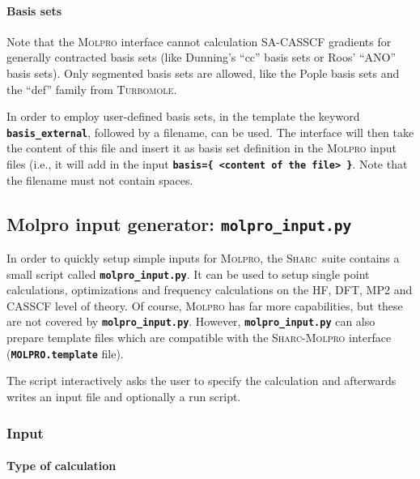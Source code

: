 \documentclass[a4paper,10pt,DIV=15,openany]{scrbook}
\newcommand{\sharc}{\textsc{Sharc}}
\newcommand{\ttt}[1]{\textbf{\texttt{#1}}}
\begin{document}
\paragraph{Basis sets}

Note that the \textsc{Molpro} interface cannot calculation SA-CASSCF gradients for generally contracted basis sets (like Dunning's ``cc'' basis sets or Roos' ``ANO'' basis sets). Only segmented basis sets are allowed, like the Pople basis sets and the ``def'' family from \textsc{Turbomole}.

In order to employ user-defined basis sets, in the template the keyword \ttt{basis\_external}, followed by a filename, can be used.
The interface will then take the content of this file and insert it as basis set definition in the \textsc{Molpro} input files (i.e., it will add in the input \ttt{basis=\{ <content of the file> \}}.
Note that the filename must not contain spaces.
















\subsection{Molpro input generator: \ttt{molpro\_input.py}}\label{sec:molpro_input.py}

In order to quickly setup simple inputs for \textsc{Molpro}, the \sharc\ suite contains a small script called \ttt{molpro\_input.py}. It can be used to setup single point calculations, optimizations and frequency calculations on the HF, DFT, MP2 and CASSCF level of theory. Of course, \textsc{Molpro} has far more capabilities, but these are not covered by \ttt{molpro\_input.py}. However, \ttt{molpro\_input.py} can also prepare template files which are compatible with the \sharc-\textsc{Molpro} interface (\ttt{MOLPRO.template} file).

The script interactively asks the user to specify the calculation and afterwards writes an input file and optionally a run script.

\subsubsection{Input}

\paragraph{Type of calculation}
\end{document}
